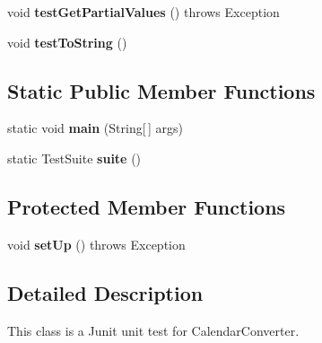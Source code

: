 \begin{DoxyCompactItemize}
\item 
\hypertarget{classorg_1_1joda_1_1time_1_1convert_1_1_test_calendar_converter_a611f8d33f35f662426a5cbfbf905fd7f}{void {\bfseries test\-Get\-Partial\-Values} ()  throws Exception }\label{classorg_1_1joda_1_1time_1_1convert_1_1_test_calendar_converter_a611f8d33f35f662426a5cbfbf905fd7f}

\item 
\hypertarget{classorg_1_1joda_1_1time_1_1convert_1_1_test_calendar_converter_a8cde0e68967046d8f3ae4067d26f179c}{void {\bfseries test\-To\-String} ()}\label{classorg_1_1joda_1_1time_1_1convert_1_1_test_calendar_converter_a8cde0e68967046d8f3ae4067d26f179c}

\end{DoxyCompactItemize}
\subsection*{Static Public Member Functions}
\begin{DoxyCompactItemize}
\item 
\hypertarget{classorg_1_1joda_1_1time_1_1convert_1_1_test_calendar_converter_a3f5b4bf129b39877fb4b447930115c76}{static void {\bfseries main} (String\mbox{[}$\,$\mbox{]} args)}\label{classorg_1_1joda_1_1time_1_1convert_1_1_test_calendar_converter_a3f5b4bf129b39877fb4b447930115c76}

\item 
\hypertarget{classorg_1_1joda_1_1time_1_1convert_1_1_test_calendar_converter_a8e035e79f9f4db917e5af39794048d7e}{static Test\-Suite {\bfseries suite} ()}\label{classorg_1_1joda_1_1time_1_1convert_1_1_test_calendar_converter_a8e035e79f9f4db917e5af39794048d7e}

\end{DoxyCompactItemize}
\subsection*{Protected Member Functions}
\begin{DoxyCompactItemize}
\item 
\hypertarget{classorg_1_1joda_1_1time_1_1convert_1_1_test_calendar_converter_a720500c522bc833128ab23df2dffe013}{void {\bfseries set\-Up} ()  throws Exception }\label{classorg_1_1joda_1_1time_1_1convert_1_1_test_calendar_converter_a720500c522bc833128ab23df2dffe013}

\end{DoxyCompactItemize}


\subsection{Detailed Description}
This class is a Junit unit test for Calendar\-Converter.


